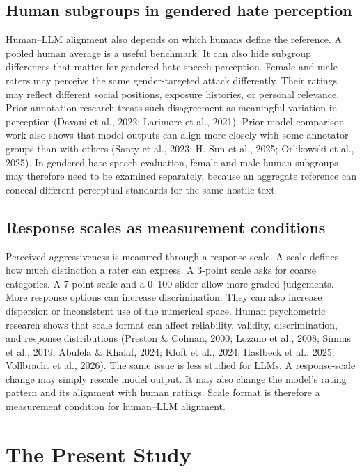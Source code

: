 \documentclass[a4paper,fleqn,review]{cas-sc}
\begin{document}
\subsection{Human subgroups in gendered hate perception}

Human--LLM alignment also depends on which humans define the reference. A pooled human average is a useful benchmark. It can also hide subgroup differences that matter for gendered hate-speech perception. Female and male raters may perceive the same gender-targeted attack differently. Their ratings may reflect different social positions, exposure histories, or personal relevance. Prior annotation research treats such disagreement as meaningful variation in perception (Davani et al., 2022; Larimore et al., 2021). Prior model-comparison work also shows that model outputs can align more closely with some annotator groups than with others (Santy et al., 2023; H. Sun et al., 2025; Orlikowski et al., 2025). In gendered hate-speech evaluation, female and male human subgroups may therefore need to be examined separately, because an aggregate reference can conceal different perceptual standards for the same hostile text.

\subsection{Response scales as measurement conditions}

Perceived aggressiveness is measured through a response scale. A scale defines how much distinction a rater can express. A 3-point scale asks for coarse categories. A 7-point scale and a 0--100 slider allow more graded judgements. More response options can increase discrimination. They can also increase dispersion or inconsistent use of the numerical space. Human psychometric research shows that scale format can affect reliability, validity, discrimination, and response distributions (Preston \& Colman, 2000; Lozano et al., 2008; Simms et al., 2019; Abulela \& Khalaf, 2024; Kloft et al., 2024; Haslbeck et al., 2025; Vollbracht et al., 2026). The same issue is less studied for LLMs. A response-scale change may simply rescale model output. It may also change the model's rating pattern and its alignment with human ratings. Scale format is therefore a measurement condition for human--LLM alignment.

\section{The Present Study}
\label{sec:present-study}
\end{document}
